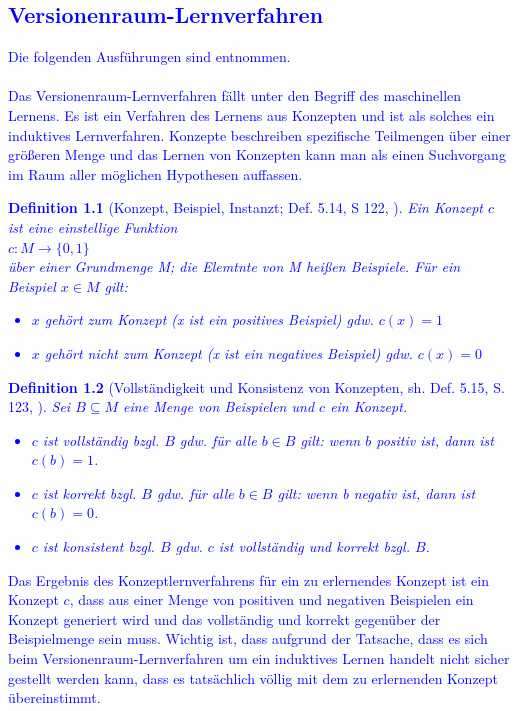 \documentclass[a4paper, 11pt]{book}
\newtheorem{Def}{Definition }[section]
\begin{document}
\textcolor{blue}{
	\chapter{Versionenraum-Lernverfahren} \label{VRL} 
	Die folgenden Ausführungen sind \cite{BKI08} entnommen.\\
	\\
	 Das Versionenraum-Lernverfahren fällt unter den Begriff des maschinellen Lernens. Es ist ein Verfahren des Lernens aus Konzepten und ist als solches ein induktives Lernverfahren. Konzepte beschreiben spezifische Teilmengen über einer größeren Menge und das Lernen von Konzepten kann man als einen Suchvorgang im Raum aller möglichen Hypothesen auffassen. 
	\begin{Def}[Konzept, Beispiel, Instanzt; Def. 5.14, S 122, \cite{BKI08}]
		Ein Konzept $ c $ ist eine einstellige Funktion\\
		\hspace{2cm} $ c: M \rightarrow \{0,1\} $\\	
		über einer Grundmenge M; die Elemtnte von M heißen Beispiele. Für ein Beispiel $ x \in M $ gilt:\\
		\begin{itemize}
			\item $ x $ gehört zum Konzept (x ist ein positives Beispiel) gdw. $ c(x) = 1 $
			\item $ x $ gehört nicht zum Konzept (x ist ein negatives Beispiel) gdw. $ c(x) = 0 $
		\end{itemize}
	\end{Def}
\begin{Def}[Vollständigkeit und Konsistenz von Konzepten, sh. Def. 5.15, S. 123, \cite{BKI08}]
	Sei $ B \subseteq M $ eine Menge von Beispielen und $ c $ ein Konzept.
	\begin{itemize}
		\item $ c $ ist vollständig bzgl. $ B $ gdw. für alle $ b \in B $ gilt: wenn $ b $ positiv ist, dann ist $ c(b) = 1 $.
		\item $ c $ ist korrekt bzgl. $ B $ gdw. für alle $ b \in B $ gilt: wenn b negativ ist, dann ist $ c(b) = 0 $.
		\item $ c $ ist konsistent bzgl. $ B $ gdw. $ c $ ist vollständig und korrekt bzgl. $ B $. 
	\end{itemize}
\end{Def}
Das Ergebnis des Konzeptlernverfahrens für ein zu erlernendes Konzept ist ein Konzept $ c $, dass aus einer Menge von positiven und negativen Beispielen ein Konzept generiert wird und das vollständig und korrekt gegenüber der Beispielmenge sein muss. Wichtig ist, dass aufgrund der Tatsache, dass es sich beim Versionenraum-Lernverfahren um ein induktives Lernen handelt nicht sicher gestellt werden kann, dass es tatsächlich völlig mit dem zu erlernenden Konzept übereinstimmt.
}
\end{document}
